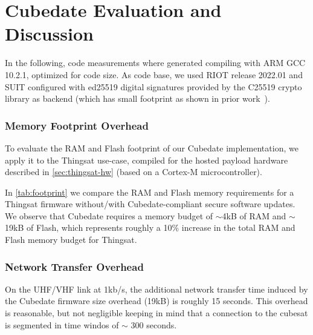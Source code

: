 \section{Cubedate Evaluation and Discussion}
\label{sec:evaluation}



In the following, code measurements where generated compiling with ARM GCC 10.2.1,
optimized for code size. As code base, we used RIOT release 2022.01 and SUIT configured with ed25519 digital signatures provided by the C25519 crypto library as backend (which has small footprint as shown in prior work~\cite{zandberg2019secure}).

\subsubsection{Memory Footprint Overhead}

To evaluate the RAM and Flash footprint of our Cubedate implementation, we apply it to the Thingsat use-case, compiled for the hosted payload hardware described in \autoref{sec:thingsat-hw} (based on a Cortex-M microcontroller).  

In \autoref{tab:footprint} we compare the RAM and Flash memory requirements for a Thingsat firmware without/with Cubedate-compliant secure software updates.
We observe that Cubedate requires a memory budget of $\sim$4kB of RAM and $\sim$19kB of Flash, which represents roughly a 10\% increase in the total RAM and Flash memory budget for Thingsat.

\subsubsection{Network Transfer Overhead}
On the UHF/VHF link at 1kb/s, the additional network transfer time induced by the Cubedate firmware size overhead (19kB) is roughly 15 seconds. This overhead is reasonable, but not negligible keeping in mind that a connection to the cubesat is segmented in time windos of $\sim$ 300 seconds.

